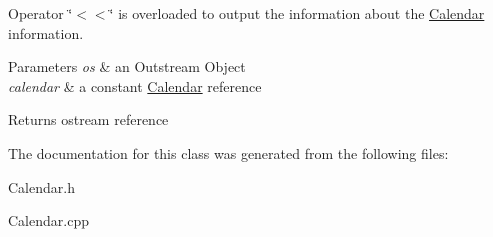 Operator \char`\"{}$<$$<$\char`\"{} is overloaded to output the information about the \hyperlink{class_calendar}{Calendar} information. 


\begin{DoxyParams}{Parameters}
{\em os} & an Outstream Object \\
\hline
{\em calendar} & a constant \hyperlink{class_calendar}{Calendar} reference \\
\hline
\end{DoxyParams}
\begin{DoxyReturn}{Returns}
ostream reference 
\end{DoxyReturn}


The documentation for this class was generated from the following files\+:\begin{DoxyCompactItemize}
\item 
Calendar.\+h\item 
Calendar.\+cpp\end{DoxyCompactItemize}
